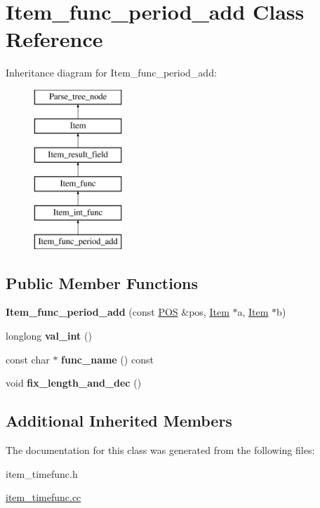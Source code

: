 \hypertarget{classItem__func__period__add}{}\section{Item\+\_\+func\+\_\+period\+\_\+add Class Reference}
\label{classItem__func__period__add}
Inheritance diagram for Item\+\_\+func\+\_\+period\+\_\+add\+:\begin{figure}[H]
\begin{center}
\leavevmode
\includegraphics[height=6.000000cm]{classItem__func__period__add}
\end{center}
\end{figure}
\subsection*{Public Member Functions}
\begin{DoxyCompactItemize}
\item 
\mbox{\label{classItem__func__period__add_af4c4c2d8a96fed053ab9cac85b3b6310}} 
{\bfseries Item\+\_\+func\+\_\+period\+\_\+add} (const \mbox{\hyperlink{structYYLTYPE}{P\+OS}} \&pos, \mbox{\hyperlink{classItem}{Item}} $\ast$a, \mbox{\hyperlink{classItem}{Item}} $\ast$b)
\item 
\mbox{\label{classItem__func__period__add_adffeacad0321d8bd9905b7e471cdba24}} 
longlong {\bfseries val\+\_\+int} ()
\item 
\mbox{\label{classItem__func__period__add_a121752cf83d79b14f792e034a61668ef}} 
const char $\ast$ {\bfseries func\+\_\+name} () const
\item 
\mbox{\label{classItem__func__period__add_a9762a8894a11a3705092d1d217557a34}} 
void {\bfseries fix\+\_\+length\+\_\+and\+\_\+dec} ()
\end{DoxyCompactItemize}
\subsection*{Additional Inherited Members}


The documentation for this class was generated from the following files\+:\begin{DoxyCompactItemize}
\item 
item\+\_\+timefunc.\+h\item 
\mbox{\hyperlink{item__timefunc_8cc}{item\+\_\+timefunc.\+cc}}\end{DoxyCompactItemize}
